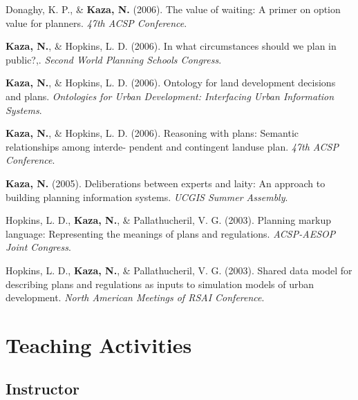 \documentclass[11pt,a4paper,]{awesome-cv}
\newlength{\cslhangindent}
\newenvironment{CSLReferences}[2] %
 {\begin{list}{}{%
  \setlength{\itemindent}{0pt}
  \setlength{\leftmargin}{0pt}
  \setlength{\parsep}{0pt}
  \ifodd #1
   \setlength{\leftmargin}{\cslhangindent}
   \setlength{\itemindent}{-1\cslhangindent}
  \fi
  \setlength{\itemsep}{#2\baselineskip}}}
 {\end{list}}
\begin{document}
\begin{CSLReferences}{1}{0}
Donaghy, K. P., \& \textbf{Kaza, N.} (2006). The value of waiting: A
primer on option value for planners. \emph{47th ACSP Conference}.

\textbf{Kaza, N.}, \& Hopkins, L. D. (2006). In what circumstances
should we plan in public?,. \emph{Second World Planning Schools
Congress}.

\textbf{Kaza, N.}, \& Hopkins, L. D. (2006). Ontology for land
development decisions and plans. \emph{Ontologies for Urban Development:
Interfacing Urban Information Systems}.

\textbf{Kaza, N.}, \& Hopkins, L. D. (2006). Reasoning with plans:
Semantic relationships among interde- pendent and contingent landuse
plan. \emph{47th ACSP Conference}.

\textbf{Kaza, N.} (2005). Deliberations between experts and laity: An
approach to building planning information systems. \emph{UCGIS Summer
Assembly}.

Hopkins, L. D., \textbf{Kaza, N.}, \& Pallathucheril, V. G. (2003).
Planning markup language: Representing the meanings of plans and
regulations. \emph{ACSP-AESOP Joint Congress}.

Hopkins, L. D., \textbf{Kaza, N.}, \& Pallathucheril, V. G. (2003).
Shared data model for describing plans and regulations as inputs to
simulation models of urban development. \emph{North American Meetings of
RSAI Conference}.

\end{CSLReferences}

\section{Teaching Activities}\label{teaching-activities}

\subsection{Instructor}\label{instructor}
\end{document}
